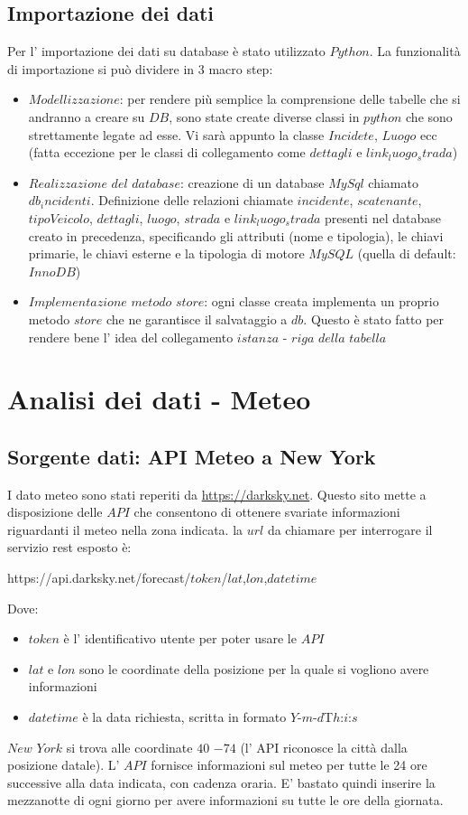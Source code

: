 \documentclass[12pt, a4paper]{scrartcl}
\begin{document}
\subsection*{Importazione dei dati}
Per l' importazione dei dati su database è stato utilizzato $Python$.
La funzionalità di importazione si può dividere in 3 macro step:
\begin{itemize}
\item $Modellizzazione$: per rendere più semplice la comprensione delle tabelle che si andranno a creare su $DB$, sono state create diverse classi in $python$ che sono strettamente legate ad esse. Vi sarà appunto la classe $Incidete$, $Luogo$ ecc (fatta eccezione per le classi di collegamento come $dettagli$ e $link_luogo_strada$)
\item $Realizzazione$ $del$ $database$: creazione di un database $MySql$ chiamato $db_incidenti$.
Definizione delle relazioni chiamate $incidente$, $scatenante$, $tipoVeicolo$,
$dettagli$, $luogo$, $strada$ e $link_luogo_strada$ presenti nel database creato
in precedenza, specificando gli attributi (nome e tipologia), le chiavi
primarie, le chiavi esterne e la tipologia di motore $MySQL$ (quella di default: $InnoDB$)
\item $Implementazione$ $metodo$ $store$: ogni classe creata implementa un proprio metodo $store$ che ne garantisce il salvataggio a $db$. Questo è stato fatto per rendere bene l' idea del collegamento $istanza$ - $riga$ $della$ $tabella$


\end{itemize}
\newpage
\section*{Analisi dei dati - Meteo}

\subsection*{Sorgente dati: API Meteo a New York}
I dato meteo sono stati reperiti da \href{https://darksky.net}{https://darksky.net}.
Questo sito mette a disposizione delle $API$ che consentono di ottenere svariate informazioni riguardanti il meteo nella zona indicata.
la $url$ da chiamare per interrogare il servizio rest esposto è:
\newline
\begin{center}
https://api.darksky.net/forecast/$token$/$lat$,$lon$,$datetime$
\end{center}
Dove:
\begin{itemize}
\item $token$ è l' identificativo utente per poter usare le $API$
\item $lat$ e $lon$ sono le coordinate della posizione per la quale si vogliono avere
 informazioni
\item $datetime$ è la data richiesta, scritta in formato $Y$-$m$-$d$T$h$:$i$:$s$
\end{itemize}
$New$ $York$ si trova alle coordinate $40$ $-74$ (l' API riconosce la città dalla posizione datale).
L' $API$ fornisce informazioni sul meteo per tutte le 24 ore successive alla data indicata, con cadenza oraria. E' bastato quindi inserire la mezzanotte di ogni giorno per avere informazioni su tutte le ore della giornata.
\end{document}
